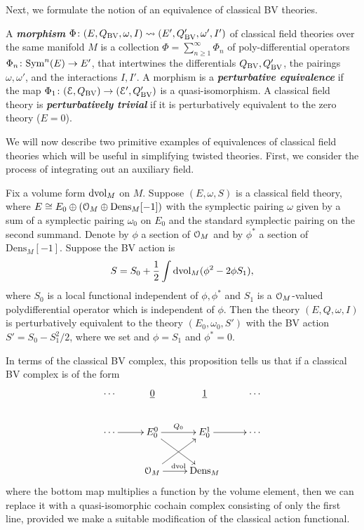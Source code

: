 \documentclass[10pt, oneside]{article}
\newcommand{\Dens}{\mathrm{Dens}}
\newcommand{\defterm}[1]{\textbf{\emph{#1}}}
\begin{document}
Next, we formulate the notion of an equivalence of classical BV theories. 

\begin{definition}
A \defterm{morphism} $\Phi \colon (E, Q_{\mathrm{BV}}, \omega, I) \rightsquigarrow (E', Q_{\mathrm{BV}}', \omega', I')$ of classical field theories over the same manifold $M$ is
a collection $\Phi =\sum_{n\geq 1}^\infty \Phi_n$ of poly-differential operators $\Phi_n\colon {\rm Sym}^n(E)\rightarrow E'$, that intertwines the differentials $Q_{\mathrm{BV}}, Q_{\mathrm{BV}}'$, the pairings $\omega, \omega'$, and the interactions $I,I'$. A morphism is a \defterm{perturbative equivalence} if the map $\Phi_1\colon (\mathcal E, Q_{\mathrm{BV}})\rightarrow (\mathcal E', Q_{\mathrm{BV}}')$ is a quasi-isomorphism. 
A classical field theory is \defterm{perturbatively trivial} if it is perturbatively equivalent to the zero theory ($E = 0$).
\label{def:perturbativeequivalence}
\end{definition}

We will now describe two primitive examples of equivalences of classical field theories which will be useful in simplifying twisted theories. 
First, we consider the process of integrating out an auxiliary field.

\begin{prop}\label{prop:integrateoutfield}
Fix a volume form $\operatorname{dvol}_M$ on $M$. Suppose $(E, \omega, S)$ is a classical field theory, where $E\cong E_0\oplus (\cO_M\oplus \Dens_M[-1])$ with the symplectic pairing $\omega$ given by a sum of a symplectic pairing $\omega_0$ on $E_0$ and the standard symplectic pairing on the second summand. Denote by $\phi$ a section of $\mathcal O_M$ and by $\phi^*$ a section of $\Dens_M[-1]$. Suppose the BV action is
\[S = S_0 + \frac{1}{2} \int \operatorname{dvol}_M (\phi^2 - 2\phi S_1),\]
where $S_0$ is a local functional independent of $\phi,\phi^*$ and $S_1$ is a $\mathcal O_M$-valued polydifferential operator which is independent of $\phi$. 
Then the theory $(E, Q, \omega, I)$ is perturbatively equivalent to the theory $(E_0, \omega_0, S')$ with the BV action $S' = S_0 - S_1^2/2$, where we set and $\phi = S_1$ and $\phi^* = 0$.
\end{prop}

\begin{remark}
In terms of the classical BV complex, this proposition tells us that if a classical BV complex is of the form
\[\xymatrix{
\cdots & \ul{0} & \ul{1} & \cdots \\
\cdots \ar[r] & E_0^0 \ar[r]^{Q_0} \ar[dr] & E_0^1 \ar[r] &\cdots \\
&\cO_M \ar^{{\rm dvol}}[r] \ar[ur] &\dens_M &
}\]
where the bottom map multiplies a function by the volume element, then we can replace it with a quasi-isomorphic cochain complex consisting of only the first line, provided we make a suitable modification of the classical action functional. 
\end{remark}
\end{document}

